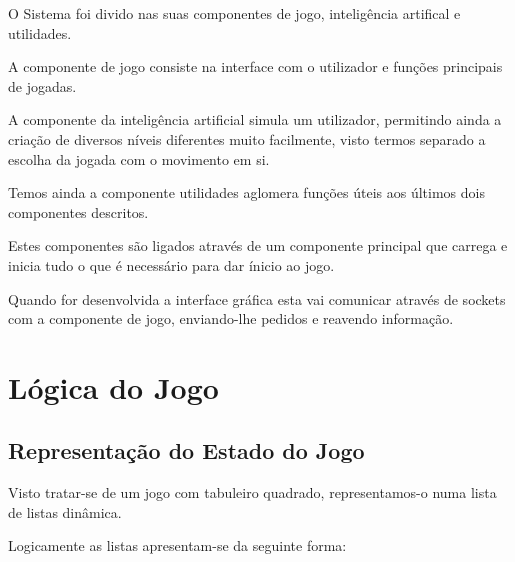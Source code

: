 \documentclass[a4paper]{article}
\begin{document}
O Sistema foi divido nas suas componentes de jogo, inteligência artifical e utilidades.

A componente de jogo consiste na interface com o utilizador e funções principais de jogadas.

A componente da inteligência artificial simula um utilizador, permitindo ainda a criação de diversos níveis diferentes muito facilmente, visto termos separado a escolha da jogada com o movimento em si.

Temos ainda a componente utilidades aglomera funções úteis aos últimos dois componentes descritos.

Estes componentes são ligados através de um componente principal que carrega e inicia tudo o que é necessário para dar ínicio ao jogo.

Quando for desenvolvida a interface gráfica esta vai comunicar através de sockets com a componente de jogo, enviando-lhe pedidos e reavendo informação.


\section{Lógica do Jogo}


\subsection{Representação do Estado do Jogo} 
Visto tratar-se de um jogo com tabuleiro quadrado, representamos-o numa lista de listas dinâmica.

Logicamente as listas apresentam-se da seguinte forma:
\end{document}
